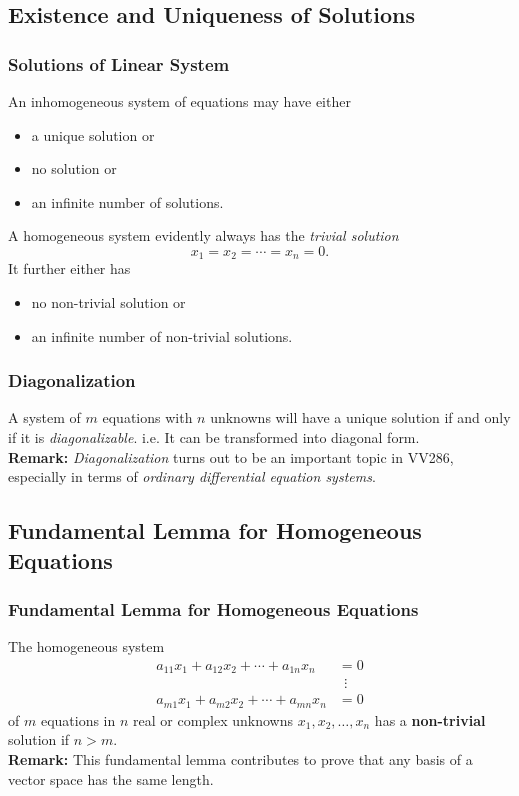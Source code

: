 \documentclass[12pt, t]{beamer}
\renewcommand{\emph}[1]{{\color{Turquoise3}\textsl{#1}}}
\newcommand{\myseries}[2]{$#1_1,#1_2,\dots,#1_#2$}
\begin{document}
\subsection{Existence and Uniqueness of Solutions}
\begin{frame}
    \frametitle{Solutions of Linear System}
    An inhomogeneous system of equations may have either
    \begin{itemize}
        \item a unique solution or
        \item no solution or
        \item an infinite number of solutions.
    \end{itemize}
    A homogeneous system evidently always has the \emph{trivial solution} \[x_1=x_2=\cdots=x_n=0.\]
    It further either has
    \begin{itemize}
        \item no non-trivial solution or
        \item an infinite number of non-trivial solutions.
    \end{itemize}


\end{frame}

\begin{frame}
    \frametitle{Diagonalization}
    A system of $m$ equations with $n$ unknowns will have a unique solution if and only if it is \emph{diagonalizable}. i.e. It can be transformed into diagonal form.\\[15pt]
    \textbf{Remark:} \emph{Diagonalization} turns out to be an important topic in VV286, especially in terms of \emph{ordinary differential equation systems}.
\end{frame}

\subsection{Fundamental Lemma for Homogeneous Equations}
\begin{frame}
    \frametitle{Fundamental Lemma for Homogeneous Equations}
    The homogeneous system
    \begin{align*}
        a_{11}x_1+a_{12}x_2+\cdots+a_{1n}x_n & =0       \\
                                             & ~~\vdots \\
        a_{m1}x_1+a_{m2}x_2+\cdots+a_{mn}x_n & =0
    \end{align*}
    of $m$ equations in $n$ real or complex unknowns \myseries{x}{n} has a \textbf{non-trivial} solution if $n>m$.\\[15pt]

    \textbf{Remark:} This fundamental lemma contributes to prove that any basis of a vector space has the same length.

\end{frame}
\end{document}
